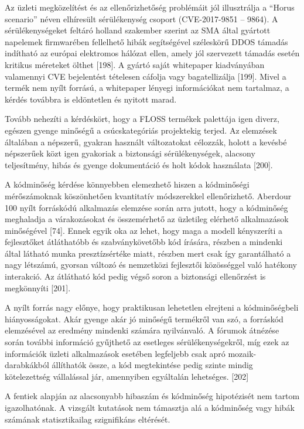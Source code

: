 \documentclass[12pt,magyar,a4paper,oneside]{scrreprt}
\begin{document}
Az üzleti megközelítést és az ellenőrizhetőség problémáit jól
illusztrálja a ``Horus scenario'' néven elhíresült sérülékenység csoport
(CVE-2017-9851 -- 9864). A sérülékenységeket feltáró holland szakember
szerint az SMA által gyártott napelemek firmwarében fellelhető hibák
segítségével széleskörű DDOS támadás indítható az európai elektromos
hálózat ellen, amely jól szervezett támadás esetén kritikus méreteket
ölthet {[}198{]}. A gyártó saját whitepaper kiadványában valamennyi CVE
bejelentést tételesen cáfolja vagy bagatellizálja {[}199{]}. Mivel a
termék nem nyílt forrású, a whitepaper lényegi információkat nem
tartalmaz, a kérdés továbbra is eldöntetlen és nyitott marad.

Tovább nehezíti a kérdéskört, hogy a FLOSS termékek palettája igen
diverz, egészen gyenge minőségű a csúcskategóriás projektekig terjed. Az
elemzések általában a népszerű, gyakran használt változatokat célozzák,
holott a kevésbé népszerűek közt igen gyakoriak a biztonsági
sérülékenységek, alacsony teljesítmény, hibás és gyenge dokumentáció és
holt kódok használata {[}200{]}.

A kódminőség kérdése könnyebben elemezhető hiszen a kódminőségi
mérőszámoknak köszönhetően kvantitatív módszerekkel ellenőrizhető.
Aberdour 100 nyílt forráskódú alkalmazás elemzése során arra jutott,
hogy a kódminőség meghaladja a várakozásokat és összemérhető az
üzletileg elérhető alkalmazások minőségével {[}74{]}. Ennek egyik oka az
lehet, hogy maga a modell kényszeríti a fejlesztőket átláthatóbb és
szabványkövetőbb kód írására, részben a mindenki által látható munka
presztízsértéke miatt, részben mert csak így garantálható a nagy
létszámú, gyorsan változó és nemzetközi fejlesztői közösséggel való
hatékony interakció. Az átlátható kód pedig végső soron a biztonsági
ellenőrzést is megkönnyíti {[}201{]}.

A nyílt forrás nagy előnye, hogy praktikusan lehetetlen elrejteni a
kódminőségbeli hiányosságokat. Akár gyenge akár jó minőségű termékről
van szó, a forráskód elemzésével az eredmény mindenki számára
nyilvánvaló. A fórumok átnézése során további információ gyűjthető az
esetleges sérülékenységekről, míg ezek az információk üzleti
alkalmazások esetében legfeljebb csak apró mozaik-darabkákból állíthatók
össze, a kód megtekintése pedig szinte mindig kötelezettség vállalással
jár, amennyiben egyáltalán lehetséges. {[}202{]}

A fentiek alapján az alacsonyabb hibaszám és kódminőség hipotézisét nem
tartom igazolhatónak. A vizsgált kutatások nem támasztja alá a
kódminőség vagy hibák számának statisztikailag szignifikáns eltérését.
\end{document}
